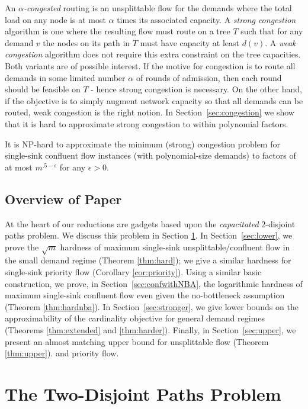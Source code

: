 \documentclass[12pt]{article}
\begin{document}
An  {\em $\alpha$-congested}  routing is an unsplittable flow for the demands where the total load on any node is at most $\alpha$ times its associated capacity.
A {\em strong congestion} algorithm is one where  the resulting flow must route on a tree $T$ such that for  any demand $v$ the nodes on its path in $T$ must have capacity at least $d(v)$. A  {\em weak congestion} algorithm does not require this extra constraint on the tree capacities.
 Both variants are of possible interest. If the motive for congestion is to route all demands in some limited number $\alpha$ of rounds of admission, then each round should be feasible on $T$ - hence strong congestion is necessary.  On the other hand, if the objective is to simply augment network capacity so that all demands can be routed, weak congestion is the right notion.
In Section~\ref{sec:congestion} we show that it is hard to approximate strong congestion to within polynomial factors.
 \begin{thm}
 \label{thm:strongcongestion}
 It is NP-hard to approximate the minimum (strong) congestion problem for single-sink confluent flow instances
 (with polynomial-size demands) to factors of at most $m^{.5-\epsilon}$ for any $\epsilon>0$.
 \end{thm}




\subsection{Overview of Paper}
At the heart of our reductions are gadgets based upon the {\em capacitated} $2$-disjoint paths problem.
We discuss this problem in Section \ref{sec:two-disjoint-paths}.
In Section~\ref{sec:lower}, we prove the $\sqrt{m}$ hardness of maximum single-sink unsplittable/confluent
flow in the small demand regime (Theorem \ref{thm:hard}); we give a similar hardness for single-sink priority flow
(Corollary \ref{cor:priority}).
Using a similar basic construction, we prove, in Section~\ref{sec:confwithNBA}, the logarithmic hardness
of maximum single-sink confluent flow
even given the no-bottleneck assumption (Theorem \ref{thm:hardnba}).
In Section~\ref{sec:stronger}, we give lower bounds
on the approximability of the cardinality objective for general demand
regimes (Theorems \ref{thm:extended} and \ref{thm:harder}).
Finally, in Section~\ref{sec:upper}, we present an almost matching upper bound for unsplittable flow (Theorem \ref{thm:upper}).
and priority flow.


\section{The Two-Disjoint Paths Problem}\label{sec:two-disjoint-paths}
\end{document}
